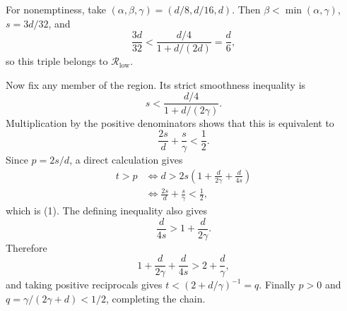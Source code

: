 For nonemptiness, take
\((\alpha,\beta,\gamma)=(d/8,d/16,d)\).  Then
\(\beta<\min(\alpha,\gamma)\), \(s=3d/32\), and
\[
\frac{3d}{32}<\frac{d/4}{1+d/(2d)}=\frac d6,
\]
so this triple belongs to \(\mathcal R_{\mathrm{low}}\).

Now fix any member of the region.  Its strict smoothness inequality is
\[
s<\frac{d/4}{1+d/(2\gamma)}.
\]
Multiplication by the positive denominators shows that this is equivalent to
\[
\frac{2s}{d}+\frac{s}{\gamma}<\frac12. \tag{1}
\]
Since \(p=2s/d\), a direct calculation gives
\[
\begin{aligned}
t>p
&\Longleftrightarrow
d>2s\left(1+\frac d{2\gamma}+\frac d{4s}\right)\\
&\Longleftrightarrow
\frac{2s}{d}+\frac{s}{\gamma}<\frac12,
\end{aligned}
\]
which is (1).  The defining inequality also gives
\[
\frac d{4s}>1+\frac d{2\gamma}.
\]
Therefore
\[
1+\frac d{2\gamma}+\frac d{4s}>2+\frac d\gamma,
\]
and taking positive reciprocals gives
\(t<(2+d/\gamma)^{-1}=q\).  Finally \(p>0\) and
\(q=\gamma/(2\gamma+d)<1/2\), completing the chain.